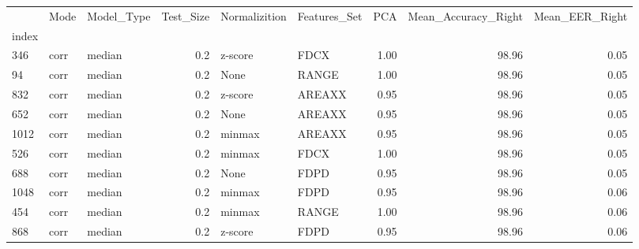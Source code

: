 \begin{tabular}{lllrllrrr}
\toprule
{} &  Mode & Model\_Type &  Test\_Size & Normalizition & Features\_Set &   PCA &  Mean\_Accuracy\_Right &  Mean\_EER\_Right \\
index &       &            &            &               &              &       &                      &                 \\
\midrule
346   &  corr &     median &        0.2 &       z-score &         FDCX &  1.00 &                98.96 &            0.05 \\
94    &  corr &     median &        0.2 &          None &        RANGE &  1.00 &                98.96 &            0.05 \\
832   &  corr &     median &        0.2 &       z-score &       AREAXX &  0.95 &                98.96 &            0.05 \\
652   &  corr &     median &        0.2 &          None &       AREAXX &  0.95 &                98.96 &            0.05 \\
1012  &  corr &     median &        0.2 &        minmax &       AREAXX &  0.95 &                98.96 &            0.05 \\
526   &  corr &     median &        0.2 &        minmax &         FDCX &  1.00 &                98.96 &            0.05 \\
688   &  corr &     median &        0.2 &          None &         FDPD &  0.95 &                98.96 &            0.05 \\
1048  &  corr &     median &        0.2 &        minmax &         FDPD &  0.95 &                98.96 &            0.06 \\
454   &  corr &     median &        0.2 &        minmax &        RANGE &  1.00 &                98.96 &            0.06 \\
868   &  corr &     median &        0.2 &       z-score &         FDPD &  0.95 &                98.96 &            0.06 \\
\bottomrule
\end{tabular}
